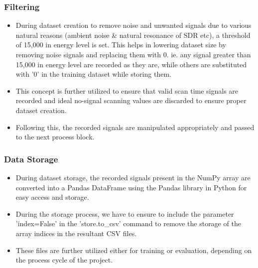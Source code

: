 \subsubsection*{Filtering}
\begin{itemize}
  \item During dataset creation to remove noise and unwanted signals due to various natural reasons (ambient noise \& natural resonance of SDR etc), a threshold of 15,000 in energy level is set. This helps in lowering dataset size by removing noise signals and replacing them with 0. ie. any signal greater than 15,000 in energy level are recorded as they are, while others are substituted with '0' in the training dataset while storing them.

  \item This concept is further utilized to ensure that valid scan time signals are recorded and ideal no-signal scanning values are discarded to ensure proper dataset creation.

  \item Following this, the recorded signals are manipulated appropriately and passed to the next process block.
\end{itemize}

\subsubsection*{Data Storage}
\begin{itemize}
  \item During dataset storage, the recorded signals present in the NumPy array are converted into a Pandas DataFrame using the Pandas library in Python for easy access and storage.
  \item During the storage process, we have to ensure to include the parameter 'index=False' in the 'store.to\_csv' command to remove the storage of the array indices in the resultant CSV files.
  \item These files are further utilized either for training or evaluation, depending on the process cycle of the project.
\end{itemize}


